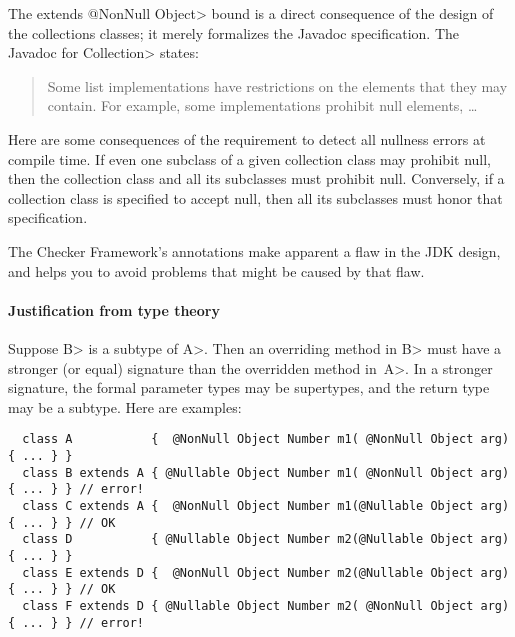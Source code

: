 
The \<extends @NonNull Object> bound is a direct consequence of the design
of the collections classes; it merely formalizes the Javadoc specification.
The Javadoc for \<Collection> states:

\begin{quote}
  Some list implementations have restrictions on the elements that they may
  contain. For example, some implementations prohibit null elements, \ldots
\end{quote}

Here are some consequences of the requirement to detect all nullness errors
at compile time.  If even one subclass of a given collection class may
prohibit null, then the collection class and all its subclasses must
prohibit null.  Conversely, if a collection class is specified to accept
null, then all its subclasses must honor that specification.

The Checker Framework's annotations make apparent a flaw in the JDK
design, and helps you to avoid problems that might be caused by that flaw.


\paragraph{Justification from type theory}
Suppose \<B> is a subtype of \<A>.
Then an overriding method in \<B> must have a stronger (or equal) signature
than the overridden method in~\<A>.  In a stronger signature, the formal
parameter types may be supertypes, and the return type may be a subtype.
Here are examples:

\begin{Verbatim}
  class A           {  @NonNull Object Number m1( @NonNull Object arg) { ... } }
  class B extends A { @Nullable Object Number m1( @NonNull Object arg) { ... } } // error!
  class C extends A {  @NonNull Object Number m1(@Nullable Object arg) { ... } } // OK
  class D           { @Nullable Object Number m2(@Nullable Object arg) { ... } }
  class E extends D {  @NonNull Object Number m2(@Nullable Object arg) { ... } } // OK
  class F extends D { @Nullable Object Number m2( @NonNull Object arg) { ... } } // error!
\end{Verbatim}


